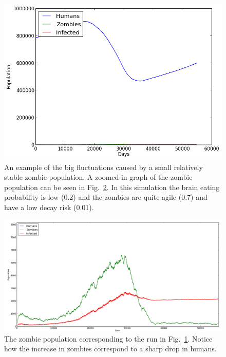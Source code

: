 \documentclass{article}
\begin{document}
\begin{figure}[h!]
\includegraphics[width=350pt]{plots/zombiesstable}
\caption{An example of the big fluctuations caused by a small relatively stable zombie population. A zoomed-in graph of the zombie population can be seen in Fig.~\ref{zombiesstablezoomed}. In this simulation the brain eating probability is low (0.2) and the zombies are quite agile (0.7) and have a low decay risk (0.01).}
\label{zombiesstable}
\end{figure}
\begin{figure}[h!]
\includegraphics[width=350pt]{plots/zombiesstablezoomed}
\caption{The zombie population corresponding to the run in Fig.~\ref{zombiesstable}. Notice how the increase in zombies correspond to a sharp drop in humans.}
\label{zombiesstablezoomed}
\end{figure}



\newpage
\end{document}
